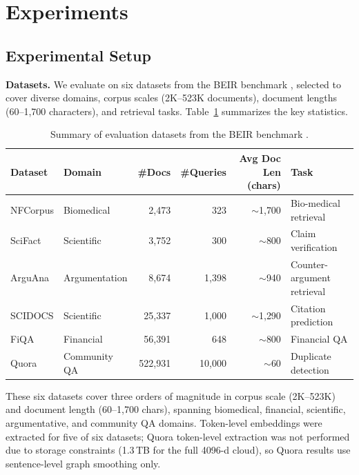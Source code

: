 \documentclass[review,1p]{elsarticle}
\begin{document}
\section{Experiments}
\label{sec:experiments}

\subsection{Experimental Setup}
\label{subsec:setup}

\textbf{Datasets.} We evaluate on six datasets from the BEIR benchmark \citep{thakur2021beir}, selected to cover diverse domains, corpus scales (2K--523K documents), document lengths (60--1,700 characters), and retrieval tasks. Table~\ref{tab:datasets} summarizes the key statistics.

\begin{table}[ht]
\centering
\caption{Summary of evaluation datasets from the BEIR benchmark \citep{thakur2021beir}.}
\label{tab:datasets}
\footnotesize
\begin{tabular}{llrrrl}
\toprule
Dataset & Domain & \#Docs & \#Queries & Avg Doc Len (chars) & Task \\
\midrule
NFCorpus & Biomedical & 2{,}473 & 323 & ${\sim}$1{,}700 & Bio-medical retrieval \\
SciFact & Scientific & 3{,}752 & 300 & ${\sim}$800 & Claim verification \\
ArguAna & Argumentation & 8{,}674 & 1{,}398 & ${\sim}$940 & Counter-argument retrieval \\
SCIDOCS & Scientific & 25{,}337 & 1{,}000 & ${\sim}$1{,}290 & Citation prediction \\
FiQA & Financial & 56{,}391 & 648 & ${\sim}$800 & Financial QA \\
Quora & Community QA & 522{,}931 & 10{,}000 & ${\sim}$60 & Duplicate detection \\
\bottomrule
\end{tabular}
\end{table}

These six datasets cover three orders of magnitude in corpus scale (2K--523K) and document length (60--1{,}700 chars), spanning biomedical, financial, scientific, argumentative, and community QA domains. Token-level embeddings were extracted for five of six datasets; Quora token-level extraction was not performed due to storage constraints (1.3\,TB for the full 4096-d cloud), so Quora results use sentence-level graph smoothing only.
\end{document}

